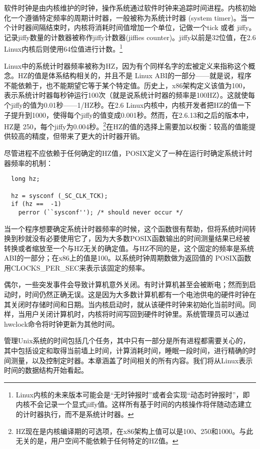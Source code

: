 软件时钟是由内核维护的时钟，操作系统通过软件时钟来追踪时间进程。内核初始化一个遵循特定频率的周期计时器，一般被称为系统计时器 (system timer)。当一个计时器间隔结束时，内核将消耗时间值增加一个单位，记做一个tick 或者 jiffy。记录jiffy数量的计数器被称作jiffy计数器(jiffies counter)。jiffy以前是32位值，在2.6 Linux内核后则使用64位值进行计数。\footnote[1]{Linux内核的未来版本可能会是“无时钟报时”或者会实现“动态时钟报时”，即内核不会记录一个显式jiffy值。这样所有基于时间的内核操作将伴随动态建立的计时器执行，而不是系统计时器。}

Linux中的系统计时器频率被称为HZ，因为有个同样名字的宏被定义来指称这个概念。HZ的值是体系结构相关的，并且不是 Linux ABI的一部分——就是说，程序不能依赖于，也不能期望它等于某个特定值。历史上，x86架构定义该值为100，表示系统计时器每秒钟运行100次（就是说系统计时器的频率是100HZ）。这就使每个jiffy的值为0.01秒——1/HZ秒。在2.6 Linux内核中，内核开发者把HZ的值一下子提升到1000，使得每个jiffy的值变成0.001秒。然而，在2.6.13和之后的版本中，HZ是 250，每个jiffy为0.004秒。\footnote[1]{HZ现在是内核编译期的可选项，在x86架构上值可以是100、250和1000。与此无关的是，用户空间不能依赖于任何特定的HZ值。}在HZ的值的选择上需要加以权衡：较高的值能提供较高的精度，但带来了更大的计时器开销。

尽管进程不应依赖于任何确定的HZ值，POSIX定义了一种在运行时确定系统计时器频率的机制： 

\begin{lstlisting}
  long hz;

  hz = sysconf (_SC_CLK_TCK);
  if (hz ==  -1)
  	perror (``sysconf''); /* should never occur */
\end{lstlisting}
  
当一个程序想要确定系统计时器频率的时候，这个函数很有帮助，但将系统时间转换到秒就没有必要使用它了，因为大多数POSIX函数输出的时间测量结果已经被转换或者缩放至一个与HZ无关的确定值。与HZ不同的是，这个固定的频率是系统ABI的一部分；在x86上的值是100。以系统时钟周期数做为返回值的 POSIX函数用CLOCKS\_PER\_SEC来表示该固定的频率。

偶尔，一些突发事件会导致计算机意外关闭。有时计算机甚至会被断电；然而到启动时，时间仍然正确无误。这是因为大多数计算机都有一个电池供电的硬件时钟在其关闭时存储时间和日期。当内核启动时，就从该硬件时钟来初始化当前时间。同样，当用户关闭计算机时，内核将时间写回到硬件时钟里。系统管理员可以通过hwclock命令将时钟更新为其他时间。

管理Unix系统的时间包括几个任务，其中只有一部分是所有进程都需要关心的，其中包括设定和取得当前墙上时间，计算消耗时间，睡眠一段时间，进行精确的时间测量，以及控制定时器。本章涵盖了时间相关的所有内容。我们将从Linux表示时间的数据结构开始看起。 

